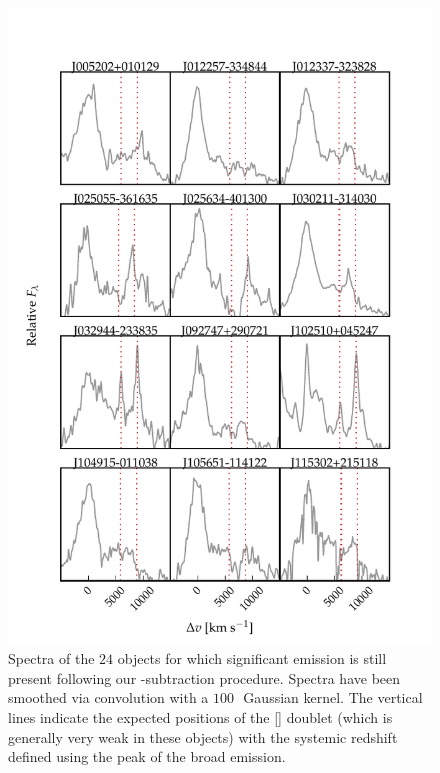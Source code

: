 \begin{figure}
    \centering
    \includegraphics[width=\columnwidth]{figures/chapter04/example_spectrum_grid_extreme_fe_1.pdf}
    \caption[{Spectra of the $24$ objects for which significant  emission is still present following our -subtraction procedure.}]{Spectra of the $24$ objects for which significant  emission is still present following our -subtraction procedure. Spectra have been smoothed via convolution with a $100$\,\kms\, Gaussian kernel. The vertical lines indicate the expected positions of the [] doublet (which is generally very weak in these objects) with the systemic redshift defined using the peak of the broad \hb emission.}
    \label{fig:bad_fe}
\end{figure}

